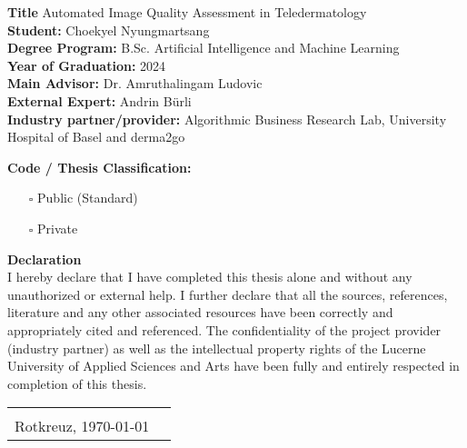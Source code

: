 \begin{titlepage}
\vspace{0.75cm}
\begin{sloppypar}
\noindent\textbf{Title} Automated Image Quality Assessment in Teledermatology\\

\noindent\textbf{Student:} Choekyel Nyungmartsang\\

\noindent\textbf{Degree Program:} B.Sc. Artificial Intelligence and Machine Learning\\

\noindent\textbf{Year of Graduation:} 2024\\

\noindent\textbf{Main Advisor:} Dr. Amruthalingam Ludovic\\

\noindent\textbf{External Expert:} Andrin Bürli\\

\noindent\textbf{Industry partner/provider:} Algorithmic Business Research Lab, University Hospital of Basel and derma2go\\
\end{sloppypar}
\vspace{2em}
\noindent\textbf{Code / Thesis Classification:}
\begin{itemize}
	\item[\rlap{\raisebox{0.3ex}{\hspace{0.4ex}\tiny \ding{56}}}$\square$]
	Public (Standard)
	\item[$\square$]
	Private
\end{itemize}

\vspace{3em}
\noindent
\textbf{Declaration}\\
I hereby declare that I have completed this thesis alone and without any unauthorized or external help. I further declare that all the sources, references, literature and any other associated resources have been correctly and appropriately cited and referenced. The confidentiality of the project provider (industry partner) as well as the intellectual property rights of the Lucerne University of Applied Sciences and Arts have been fully and entirely respected in completion of this thesis.\\
\begin{tabularx}{\textwidth}{@{}lX}
	&\\
	Rotkreuz, \today &  \\
	\cline{2-2}
\end{tabularx}


\end{titlepage}

